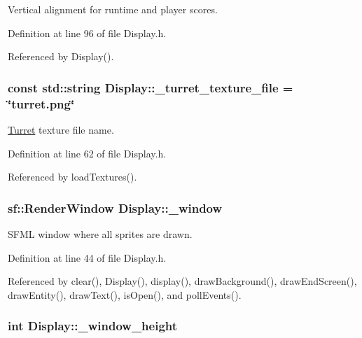 Vertical alignment for runtime and player scores. 



Definition at line 96 of file Display.\-h.



Referenced by Display().

\hypertarget{classDisplay_a1e2dc0b7ef570f4584b7f171330a209d}{
\subsubsection[{\-\_\-turret\-\_\-texture\-\_\-file}]{\setlength{\rightskip}{0pt plus 5cm}const std\-::string Display\-::\-\_\-turret\-\_\-texture\-\_\-file = \char`\"{}turret.\-png\char`\"{}\hspace{0.3cm}{\ttfamily [private]}}}\label{classDisplay_a1e2dc0b7ef570f4584b7f171330a209d}


\hyperlink{classTurret}{Turret} texture file name. 



Definition at line 62 of file Display.\-h.



Referenced by load\-Textures().

\hypertarget{classDisplay_aeb0bd9ad8ee786de5f4f0f7c738b1b11}{
\subsubsection[{\-\_\-window}]{\setlength{\rightskip}{0pt plus 5cm}sf\-::\-Render\-Window Display\-::\-\_\-window\hspace{0.3cm}{\ttfamily [private]}}}\label{classDisplay_aeb0bd9ad8ee786de5f4f0f7c738b1b11}


S\-F\-M\-L window where all sprites are drawn. 



Definition at line 44 of file Display.\-h.



Referenced by clear(), Display(), display(), draw\-Background(), draw\-End\-Screen(), draw\-Entity(), draw\-Text(), is\-Open(), and poll\-Events().

\hypertarget{classDisplay_a3e66e647786a79f49b985d45e1ad4ac2}{
\subsubsection[{\-\_\-window\-\_\-height}]{\setlength{\rightskip}{0pt plus 5cm}int Display\-::\-\_\-window\-\_\-height\hspace{0.3cm}{\ttfamily [private]}}}\label{classDisplay_a3e66e647786a79f49b985d45e1ad4ac2}


